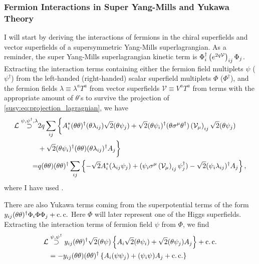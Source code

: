 \documentclass[../main.tex]{subfiles}
\begin{document}
\subsubsection*{Fermion Interactions in Super Yang-Mills and Yukawa Theory}
I will start by deriving the interactions of fermions in the chiral superfields and vector superfields of a supersymmetric Yang-Mills superlagrangian.
As a reminder, the super Yang-Mills superlagrangian kinetic term is \(\Phi^\dagger_i \left(e^{2q \mathcal{V}}\right)_{ij}\Phi_j\).
Extracting the interaction terms containing either the fermion field multiplets \(\psi\) (\(\psi^\dagger\)) from the left-handed (right-handed) scalar superfield multiplets \(\Phi\) (\(\Phi^\dagger\)),
and the fermion fields \(\lambda \equiv \lambda^a T^a\) from vector superfields \(\mathcal{V} \equiv V^a T^a\) from terms with the appropriate amount of \(\theta\)'s to survive the projection of \cref{susy:eq:projection_lagragnian}, we have
\begin{align}
  \label{susy:eq:psi_kin_int}
  \nonumber
  \L \stackrel{\psi, \psi^\dagger, \lambda}{\supset} & 2q \sum_{ij} \bigg\{ A^\ast_i (\theta\theta)^\dagger (\theta\lambda_{ij}) \sqrt{2} (\theta\psi_j) + \sqrt{2} (\theta\psi_i)^\dagger (\theta\sigma\^\mu\theta^\dagger) \pclosed{\mathcal{V}_\mu}_{ij} \sqrt{2} (\theta\psi_j) \\
  \nonumber
                                                     & + \sqrt{2} (\theta\psi_i)^\dagger (\theta\theta) (\theta\lambda_{ij})^\dagger A_j \bigg\}                                                                                                                                    \\
  =                                                  & q(\theta\theta)(\theta\theta)^\dagger \sum_{ij} \cclosed{ -\sqrt{2} A^\ast_i (\lambda_{ij}\psi_j) + (\psi_i \sigma\^\mu \pclosed{\mathcal{V}_\mu}_{ij} \psi^\dagger_j) - \sqrt{2} (\psi_i\lambda_{ij})^\dagger A_j },
\end{align}
where I have used .
\medskip

There are also Yukawa terms coming from the superpotential terms of the form \(y_{ij} (\theta\theta)^\dagger \Phi_i \Phi \Phi_j + \operatorname{c.c.}\)
Here \(\Phi\) will later represent one of the Higgs superfields.
Extracting the interaction terms of fermion field \(\psi\) from \(\Phi\), we find
\begin{align}
  \label{susy:eq:psi_yuk_int}
  \nonumber
  \mathcal{L} & \stackrel{\psi, \psi^\dagger}{\supset} y_{ij} (\theta\theta)^\dagger \sqrt{2} (\theta\psi) \left\{ A_i \sqrt{2}(\theta\psi_i) + \sqrt{2}(\theta\psi_j)A_j \right\} + \operatorname{c.c.} \\
     & = -y_{ij} (\theta\theta)(\theta\theta)^\dagger \left\{ A_i(\psi\psi_j) + (\psi_i\psi)A_j + \operatorname{c.c.} \right\}
\end{align}
\end{document}
